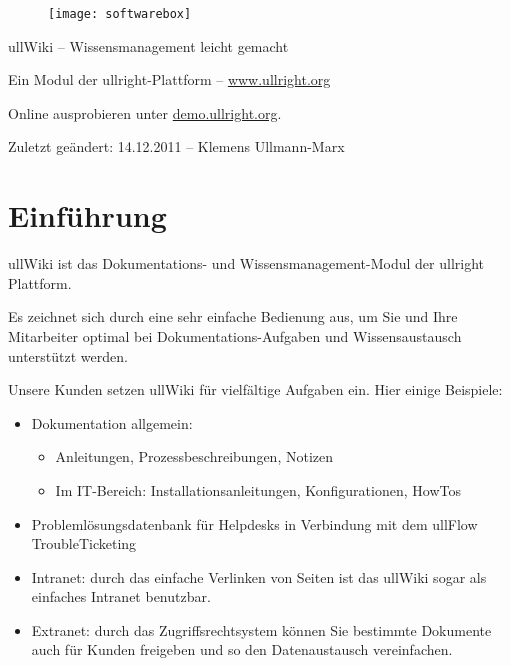 \documentclass[article, a4paper, oneside, 11pt]{memoir}
\begin{document}
\vspace*{3cm}
\begin{figure}[htp]
\centering
\texttt{[image: softwarebox]}
\end{figure}

\vspace{3cm}

{%
\huge
\color{ullblue}
ullWiki – Wissensmanagement leicht gemacht
}

\vspace{1cm}

Ein Modul der ullright-Plattform -- \href{http://www.ullright.org}{www.ullright.org}

Online ausprobieren unter \href{http://demo.ullright.org}{demo.ullright.org}. 

Zuletzt geändert: 14.12.2011 -- Klemens Ullmann-Marx

\clearpage

\pagestyle{plain}


\setcounter{secnumdepth}{2}
\setcounter{tocdepth}{2}
\tableofcontents*

\clearpage


\chapter{Einführung}
ullWiki ist das Dokumentations- und Wissensmanagement-Modul der ullright Plattform.

Es zeichnet sich durch eine sehr einfache Bedienung aus, um Sie und Ihre Mitarbeiter optimal bei Dokumentations-Aufgaben und Wissensaustausch unterstützt werden. 

Unsere Kunden setzen ullWiki für vielfältige Aufgaben ein. Hier einige Beispiele:

\begin{itemize}
\item Dokumentation allgemein:

\begin{itemize}
\item Anleitungen, Prozessbeschreibungen, Notizen
\item Im IT-Bereich: Installationsanleitungen, Konfigurationen, HowTos
\end{itemize}

\item Problemlösungsdatenbank für Helpdesks in Verbindung mit dem ullFlow TroubleTicketing
\item Intranet: durch das einfache Verlinken von Seiten ist das ullWiki sogar als einfaches Intranet benutzbar.
\item Extranet: durch das Zugriffsrechtsystem können Sie bestimmte Dokumente auch für Kunden freigeben und so den Datenaustausch vereinfachen.
\end{itemize}
\end{document}
